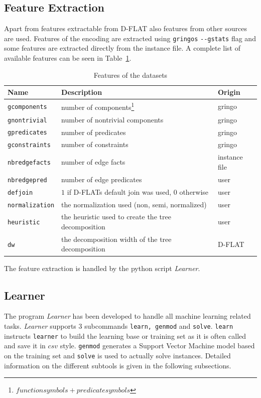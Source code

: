 \subsection{Feature Extraction}
Apart from features extractable from D-FLAT also features from other sources are used. Features of the encoding are extracted using \lstinline$gringos$ \lstinline$--gstats$ flag and some features are extracted directly from the instance file. A complete list of available features can be seen in Table~\ref{tbl:feat}.

\begin{table}
	\center
	\begin{tabular}{|l|l|l|}
		\hline
		Name & Description & Origin \\
		\hline
		\lstinline$gcomponents$ & number of components\footnote{$function symbols+ predicate symbols$} & gringo\\ %
		\lstinline$gnontrivial$ & number of nontrivial components & gringo\\
		\lstinline$gpredicates$ & number of predicates & gringo \\
		\lstinline$gconstraints$ & number of constraints & gringo\\
		\lstinline$nbredgefacts$ & number of edge facts & instance file\\
		\lstinline$nbredgepred$ & number of edge predicates & user \\
		\lstinline$defjoin$ & $1$ if D-FLATs default join was used, $0$ otherwise & user\\
		\lstinline$normalization$ & the normalization used (non, semi, normalized) & user\\
		\lstinline$heuristic$ & the heuristic used to create the tree decomposition & user\\
		\lstinline$dw$ & the decomposition width of the tree decomposition & D-FLAT\\
		\hline
	\end{tabular}
	\caption{Features of the datasets}
	\label{tbl:feat}
\end{table}
The feature extraction is handled by the python script \emph{Learner}.

\subsection{Learner}
The program \emph{Learner} has been developed to handle all machine learning related tasks. \emph{Learner} supports $3$ subcommands \lstinline$learn, genmod$ and \lstinline$solve$. 
\lstinline$learn$ instructs \lstinline$learner$ to build the learning base or training set as it is often called and save it in $csv$ style. 
\lstinline$genmod$ generates a Support Vector Machine model based on the training set and \lstinline$solve$ is used to actually solve instances. Detailed information on the different subtools is given in the following subsections.


